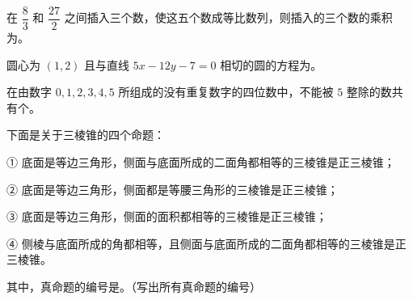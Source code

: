 \begin{question}
在 $\dfrac83$ 和 $\dfrac{27}{2}$ 之间插入三个数，使这五个数成等比数列，则插入的三个数的乘积为\gkblank{}。

\end{question}
\begin{question}
圆心为 $(1,2)$ 且与直线 $5x-12y-7=0$ 相切的圆的方程为\gkblank{}。

\end{question}
\begin{question}
在由数字 $0,1,2,3,4,5$ 所组成的没有重复数字的四位数中，不能被 $5$ 整除的数共有\gkblank{}个。

\end{question}
\begin{question}
下面是关于三棱锥的四个命题：

① 底面是等边三角形，侧面与底面所成的二面角都相等的三棱锥是正三棱锥；

② 底面是等边三角形，侧面都是等腰三角形的三棱锥是正三棱锥；

③ 底面是等边三角形，侧面的面积都相等的三棱锥是正三棱锥；

④ 侧棱与底面所成的角都相等，且侧面与底面所成的二面角都相等的三棱锥是正三棱锥。

其中，真命题的编号是\gkblank{}。（写出所有真命题的编号）

\end{question}

